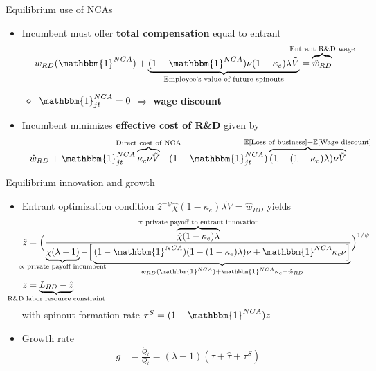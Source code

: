 \documentclass[english,usenames,dvipsnames]{beamer}
\begin{document}
\begin{frame}{Equilibrium use of NCAs}\label{use_of_ncas_details}
	\hyperlink{use_of_ncas}{}
	\begin{itemize}
		\item Incumbent must offer \alert{\textbf{total compensation}} equal to entrant
		\begin{align*}
		w_{RD}(\mathbbm{1}^{NCA}) + \underbrace{(1-\mathbbm{1}^{NCA}) \nu (1-\kappa_e) \lambda \tilde{V}}_{\mathclap{\text{Employee's value of future spinouts}}} &= \overbrace{\hat{w}_{RD}}^{\mathclap{\text{Entrant R\&D wage}}} 
		\end{align*}
		\begin{itemize}
			\item $\mathbbm{1}^{NCA}_{jt} = 0$ $\Rightarrow$ \alert{\textbf{wage discount}}
		\end{itemize}
		\item Incumbent minimizes \alert{\textbf{effective cost of R\&D}} given by
		\begin{align*}
		\hat{w}_{RD} + \mathbbm{1}^{NCA}_{jt} \overbrace{ \kappa_c \nu \tilde{V}}^{\mathclap{\text{Direct cost of NCA}}} + (1- \mathbbm{1}^{NCA}_{jt}) \overbrace{(1 - (1-\kappa_e) \lambda) \nu \tilde{V}}^{\mathclap{\mathbb{E}[\text{Loss of business}] - \mathbb{E}[\text{Wage discount}]}} 
		\end{align*}
	\end{itemize}
\end{frame}

\begin{frame}{Equilibrium innovation and growth}\label{eq_innovation_and_growth}
	\hyperlink{characterizing_BGP}{} 
	\begin{itemize}
		\item Entrant optimization condition $\hat{z}^{-\psi} \hat{\chi} (1-\kappa_e) \lambda \tilde{V}= \hat{w}_{RD}$ yields
		\begin{align*}
		\hat{z} &= \Big( \frac{ \overbrace{\hat{\chi} (1-\kappa_e) \lambda}^{\mathclap{\propto \text{ private payoff to entrant innovation}}}}{\underbrace{\chi(\lambda -1)}_{\mathclap{\propto \text{ private payoff incumbent}}} - \Big[\underbrace{(1-\mathbbm{1}^{NCA}) (1- (1-\kappa_e) \lambda)\nu + \mathbbm{1}^{NCA} \kappa_c \nu \Big]}_{\mathclap{w_{RD}(\mathbbm{1}^{NCA}) + \mathbbm{1}^{NCA} \kappa_c  - \hat{w}_{RD}}} }\Big)^{1/\psi} \\
		z &= \underbrace{\bar{L}_{RD} - \hat{z}}_{\mathclap{\text{R\&D labor resource constraint}}} 
		\end{align*}
		with spinout formation rate $\tau^S = (1-\mathbbm{1}^{NCA}) z$
		\item Growth rate
		\begin{align*}
		g &= \frac{\dot{Q}_t}{Q_t} = (\lambda - 1) (\tau + \hat{\tau} + \tau^S)
		\end{align*}
	\end{itemize}
\end{frame}
\end{document}
